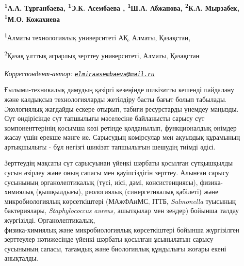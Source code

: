 
\begin{articleheader}

{\bfseries  
\textsuperscript{1}А.А. Тұрғанбаева,
\textsuperscript{1}Э.К. Асембаева\textsuperscript{\envelope } ,
\textsuperscript{1}Ш.А. Абжанова,
\textsuperscript{2}К.А. Мырзабек,
\textsuperscript{1}М.О. Кожахиева}
\end{articleheader}


\begin{affiliation}
\textsuperscript{1}Алматы технологиялық университеті АҚ, Алматы, Қазақстан,

\textsuperscript{2}Қазақ ұлттық аграрлық зерттеу университеті, Алматы, Қазақстан

\raggedright \textsuperscript{\envelope }{\em Корреспондент-автор: \href{mailto:elmiraasembaeva@mail.ru}{\nolinkurl{elmiraasembaeva@mail.ru}}}
\end{affiliation}

Ғылыми-техникалық дамудың қазіргі кезеңінде шикізатты кешенді пайдалану
және қалдықсыз технологияларды жетілдіру басты бағыт болып табылады.
Экологиялық жағдайды ескере отырып, табиғи ресурстарды үнемдеу маңызды.
Сүт өндірісінде сүт тапшылығы мәселесіне байланысты сарысу сүт
компоненттерінің қосымша көзі ретінде қолданылып, функционалдық өнімдер
жасау үшін ерекше мәнге ие. Сарысудың көмірсулар мен ақуыздық құрамының
артықшылығы - бұл негізгі шикізат тапшылығын шешудің тиімді әдісі.

Зерттеудің мақсаты сүт сарысуынан үйеңкі шәрбаты қосылған сүтқышқылды
сусын әзірлеу және оның сапасы мен қауіпсіздігін зерттеу. Алынған сарысу
сусынының органолептикалық (түсі, иісі, дәмі, консистенциясы),
физика-химиялық (қышқылдығы), реологиялық (синергетикалық қабілеті) және
микробиологиялық көрсеткіштері (МАжФАнМС, ІТТБ, \emph{Salmonella}
туысының бактериялары, \emph{Staphylococcus aureus,} ашытқылар мен
зеңдер) бойынша талдау жүргізілді. Органолептикалық, \\физика-химиялық
және микробиологиялық көрсеткіштері бойынша жүргізілген зерттеулер
нәтижесінде үйеңкі шәрбаты қосылған ұсынылатын сарысу сусынының сапасы,
тағамдық және биологиялық құндылығы жоғары екені анықталды.


